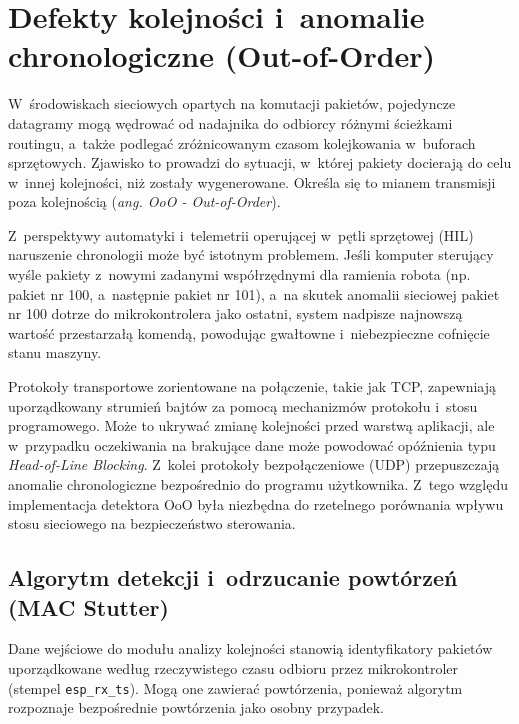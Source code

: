 \section{Defekty kolejności i~anomalie chronologiczne (Out-of-Order)}
\label{sec:ooo}

W~środowiskach sieciowych opartych na komutacji pakietów, pojedyncze datagramy mogą wędrować od nadajnika do odbiorcy różnymi ścieżkami routingu, a~także podlegać zróżnicowanym czasom kolejkowania w~buforach sprzętowych.
Zjawisko to prowadzi do sytuacji, w~której pakiety docierają do celu w~innej kolejności, niż zostały wygenerowane.
Określa się to mianem transmisji poza kolejnością (\textit{ang. OoO - Out-of-Order}).

Z~perspektywy automatyki i~telemetrii operującej w~pętli sprzętowej (HIL) naruszenie chronologii może być istotnym problemem.
Jeśli komputer sterujący wyśle pakiety z~nowymi zadanymi współrzędnymi dla ramienia robota (np. pakiet nr 100, a~następnie pakiet nr 101), a~na skutek anomalii sieciowej pakiet nr 100 dotrze do mikrokontrolera jako ostatni, system nadpisze najnowszą wartość przestarzałą komendą, powodując gwałtowne i~niebezpieczne cofnięcie stanu maszyny.

Protokoły transportowe zorientowane na połączenie, takie jak TCP, zapewniają uporządkowany strumień bajtów za pomocą mechanizmów protokołu i~stosu programowego.
Może to ukrywać zmianę kolejności przed warstwą aplikacji, ale w~przypadku oczekiwania na brakujące dane może powodować opóźnienia typu \textit{Head-of-Line Blocking}.
Z~kolei protokoły bezpołączeniowe (UDP) przepuszczają anomalie chronologiczne bezpośrednio do programu użytkownika.
Z~tego względu implementacja detektora OoO była niezbędna do rzetelnego porównania wpływu stosu sieciowego na bezpieczeństwo sterowania.

\subsection{Algorytm detekcji i~odrzucanie powtórzeń (MAC Stutter)}

Dane wejściowe do modułu analizy kolejności stanowią identyfikatory pakietów uporządkowane według rzeczywistego czasu odbioru przez mikrokontroler (stempel \texttt{esp\_rx\_ts}).
Mogą one zawierać powtórzenia, ponieważ algorytm rozpoznaje bezpośrednie powtórzenia jako osobny przypadek.

